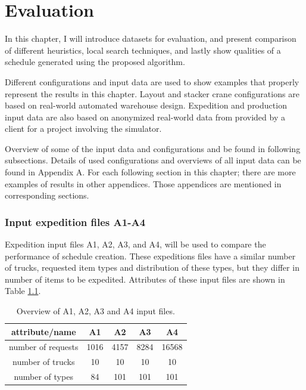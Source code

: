 \documentclass{ctuthesis}
\begin{document}
\chapter{Evaluation}
\label{ch:Evaluation}

In this chapter, I will introduce datasets for evaluation, and present comparison of different heuristics, local search techniques, and lastly show qualities of a schedule generated using the proposed algorithm.

Different configurations and input data are used to show examples that properly represent the results in this chapter. Layout and stacker crane configurations are based on real-world automated warehouse design. Expedition and production input data are also based on anonymized real-world data from provided by a client for a project involving the simulator.

Overview of some of the input data and configurations and be found in following subsections. Details of used configurations and overviews of all input data can be found in Appendix A. For each following section in this chapter; there are more examples of results in other appendices. Those appendices are mentioned in corresponding sections.


\subsection{Input expedition files A1-A4}
\label{subsec:dataA}

Expedition input files A1, A2, A3, and A4, will be used to compare the performance of schedule creation. These expeditions files have a similar number of trucks, requested item types and distribution of these types, but they differ in number of items to be expedited. Attributes of these input files are shown in Table \ref{tab:in1}.

\begin{table}[H]
\begin{tabular}{ |c| c c c c|} 
\hline
attribute/name & A1 & A2 & A3 & A4\\ 
\hline
number of requests & 1016 & 4157 & 8284 & 16568 \\
\hline
number of trucks & 10 & 10 & 10 & 10 \\ 
\hline
number of types & 84 & 101 & 101 & 101 \\ 
\hline
\end{tabular}
\caption{Overview of A1, A2, A3 and A4 input files.} \label{tab:in1}
\end{table}
\end{document}
